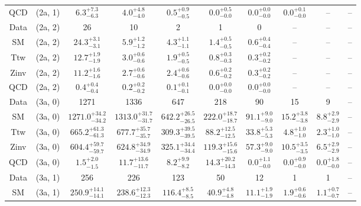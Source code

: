 \begin{table}[h!]
{\begin{tabular}{cccccccccc}
	QCD & (2a, 1) & $6.3^{+ 7.3 }_{- 6.3 }$ & $4.0^{+ 4.8 }_{- 4.0 }$ & $0.5^{+ 0.9 }_{- 0.5 }$ & $0.0^{+ 0.5 }_{- 0.0 }$ & $0.0^{+ 0.0 }_{- 0.0 }$ & $0.0^{+ 0.1 }_{- 0.0 }$ & -- & -- \\[0.5ex] 
	Data & (2a, 2) & 26 & 10 & 2 & 1 & 0 & -- & -- & -- \\[0.5ex] 
	SM & (2a, 2) & $24.3^{+ 3.1 }_{- 3.1 }$ & $5.9^{+ 1.2 }_{- 1.2 }$ & $4.3^{+ 1.1 }_{- 1.1 }$ & $1.4^{+ 0.5 }_{- 0.5 }$ & $0.6^{+ 0.4 }_{- 0.4 }$ & -- & -- & -- \\[0.5ex] 
	Ttw & (2a, 2) & $12.7^{+ 1.9 }_{- 1.9 }$ & $3.0^{+ 0.6 }_{- 0.6 }$ & $1.9^{+ 0.5 }_{- 0.5 }$ & $0.8^{+ 0.3 }_{- 0.3 }$ & $0.3^{+ 0.2 }_{- 0.2 }$ & -- & -- & -- \\[0.5ex] 
	Zinv & (2a, 2) & $11.2^{+ 1.6 }_{- 1.6 }$ & $2.7^{+ 0.6 }_{- 0.6 }$ & $2.4^{+ 0.6 }_{- 0.6 }$ & $0.6^{+ 0.2 }_{- 0.2 }$ & $0.3^{+ 0.2 }_{- 0.2 }$ & -- & -- & -- \\[0.5ex] 
	QCD & (2a, 2) & $0.4^{+ 0.4 }_{- 0.4 }$ & $0.2^{+ 0.2 }_{- 0.2 }$ & $0.1^{+ 0.1 }_{- 0.1 }$ & $0.0^{+ 0.0 }_{- 0.0 }$ & $0.0^{+ 0.0 }_{- 0.0 }$ & -- & -- & -- \\[0.5ex] 
	Data & (3a, 0) & 1271 & 1336 & 647 & 218 & 90 & 15 & 9 & -- \\[0.5ex] 
	SM & (3a, 0) & $1271.0^{+ 34.2 }_{- 34.2 }$ & $1313.0^{+ 31.7 }_{- 31.7 }$ & $642.2^{+ 26.5 }_{- 26.5 }$ & $222.0^{+ 18.7 }_{- 18.7 }$ & $91.1^{+ 9.0 }_{- 9.0 }$ & $15.2^{+ 3.8 }_{- 3.8 }$ & $8.8^{+ 2.9 }_{- 2.9 }$ & -- \\[0.5ex] 
	Ttw & (3a, 0) & $665.2^{+ 61.3 }_{- 61.3 }$ & $677.7^{+ 35.7 }_{- 35.7 }$ & $309.3^{+ 39.5 }_{- 39.5 }$ & $88.2^{+ 12.5 }_{- 12.5 }$ & $33.8^{+ 5.3 }_{- 5.3 }$ & $4.8^{+ 1.0 }_{- 1.0 }$ & $2.3^{+ 1.0 }_{- 1.0 }$ & -- \\[0.5ex] 
	Zinv & (3a, 0) & $604.4^{+ 59.7 }_{- 59.7 }$ & $624.8^{+ 34.9 }_{- 34.9 }$ & $325.1^{+ 34.4 }_{- 34.4 }$ & $119.3^{+ 15.6 }_{- 15.6 }$ & $57.3^{+ 9.0 }_{- 9.0 }$ & $10.5^{+ 3.5 }_{- 3.5 }$ & $6.5^{+ 2.9 }_{- 2.9 }$ & -- \\[0.5ex] 
	QCD & (3a, 0) & $1.5^{+ 2.0 }_{- 1.5 }$ & $11.7^{+ 13.6 }_{- 11.7 }$ & $8.2^{+ 9.9 }_{- 8.2 }$ & $14.3^{+ 20.2 }_{- 14.3 }$ & $0.0^{+ 1.1 }_{- 0.0 }$ & $0.0^{+ 0.9 }_{- 0.0 }$ & $0.0^{+ 1.8 }_{- 0.0 }$ & -- \\[0.5ex] 
	Data & (3a, 1) & 256 & 226 & 123 & 50 & 12 & 1 & 1 & -- \\[0.5ex] 
	SM & (3a, 1) & $250.9^{+ 14.1 }_{- 14.1 }$ & $238.6^{+ 12.3 }_{- 12.3 }$ & $116.4^{+ 8.5 }_{- 8.5 }$ & $40.9^{+ 4.8 }_{- 4.8 }$ & $11.1^{+ 1.9 }_{- 1.9 }$ & $1.9^{+ 0.6 }_{- 0.6 }$ & $1.1^{+ 0.7 }_{- 0.7 }$ & -- \\[0.5ex] 

\end{tabular}}
\end{table}
